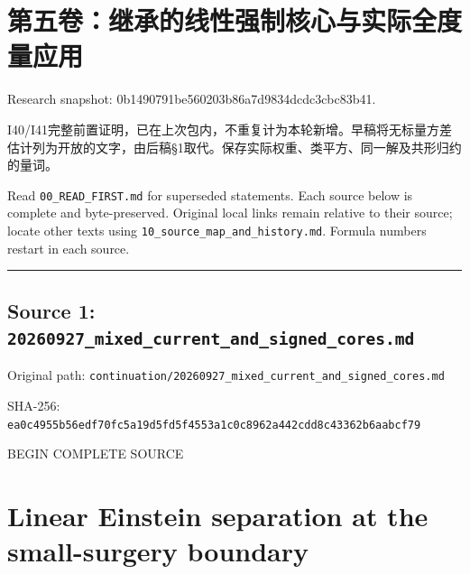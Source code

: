 \documentclass[
  10pt,
]{article}
\author{}
\date{}
\begin{document}
\hypertarget{ux7b2cux4e94ux5377ux7ee7ux627fux7684ux7ebfux6027ux5f3aux5236ux6838ux5fc3ux4e0eux5b9eux9645ux5168ux5ea6ux91cfux5e94ux7528}{%
\section{第五卷：继承的线性强制核心与实际全度量应用}\label{ux7b2cux4e94ux5377ux7ee7ux627fux7684ux7ebfux6027ux5f3aux5236ux6838ux5fc3ux4e0eux5b9eux9645ux5168ux5ea6ux91cfux5e94ux7528}}

Research snapshot: 0b1490791be560203b86a7d9834dcdc3cbc83b41.

I40/I41完整前置证明，已在上次包内，不重复计为本轮新增。早稿将无标量方差估计列为开放的文字，由后稿§1取代。保存实际权重、类平方、同一解及共形归约的量词。

Read \nolinkurl{00_READ_FIRST.md} for superseded statements. Each source below is
complete and byte-preserved. Original local links remain relative to
their source; locate other texts using \nolinkurl{10_source_map_and_history.md}.
Formula numbers restart in each source.

\begin{center}\rule{0.5\linewidth}{0.5pt}\end{center}

\hypertarget{source-1-20260927_mixed_current_and_signed_cores.md}{%
\subsection{Source 1:
\nolinkurl{20260927_mixed_current_and_signed_cores.md}}\label{source-1-20260927_mixed_current_and_signed_cores.md}}

Original path:
\nolinkurl{continuation/20260927_mixed_current_and_signed_cores.md}

SHA-256:
\nolinkurl{ea0c4955b56edf70fc5a19d5fd5f4553a1c0c8962a442cdd8c43362b6aabcf79}

BEGIN COMPLETE SOURCE

\hypertarget{linear-einstein-separation-at-the-small-surgery-boundary}{%
\section{Linear Einstein separation at the small-surgery
boundary}\label{linear-einstein-separation-at-the-small-surgery-boundary}}
\end{document}
